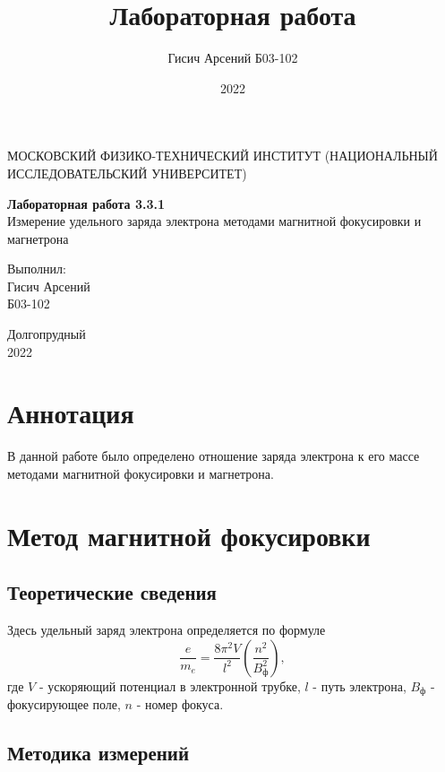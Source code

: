 \documentclass[a4paper, 12pt]{article}
\title{Лабораторная работа}
\author{Гисич Арсений Б03-102}
\date{2022}
\begin{document}
	\begin{center}
		{\large МОСКОВСКИЙ ФИЗИКО-ТЕХНИЧЕСКИЙ ИНСТИТУТ (НАЦИОНАЛЬНЫЙ ИССЛЕДОВАТЕЛЬСКИЙ УНИВЕРСИТЕТ)}
	\end{center}
	\vspace{5 cm}
	{\Large
		\begin{center}
			{\bf Лабораторная работа 3.3.1}\\[0.2 cm]
			Измерение удельного заряда электрона методами магнитной фокусировки и магнетрона
		\end{center}
	}
	\vspace{4 cm}
	\begin{flushright}
		{\Large Выполнил: \\
			\vspace{0.2 cm}
			Гисич Арсений \\
			\vspace{0.2 cm}
			Б03-102 \\}
	\end{flushright}
	\vspace{9 cm}
	\begin{center}
		Долгопрудный\\[0.1 cm]
		2022
	\end{center}
\thispagestyle{empty}

\section{Аннотация}

В данной работе было определено отношение заряда электрона к его массе методами магнитной фокусировки и магнетрона.

\section{Метод магнитной фокусировки}

\subsection{Теоретические сведения}

Здесь удельный заряд электрона определяется по формуле
\begin{equation}
\dfrac{e}{m_e} = \dfrac{8\pi^2V}{l^2} \left(\dfrac{n^2}{B_{\text{ф}}^2} \right),
\end{equation}
где $V$ - ускоряющий потенциал в электронной трубке, $l$ - путь электрона, $B_{\text{ф}}$ - фокусирующее поле, $n$ - номер фокуса.

\subsection{Методика измерений}
\end{document}
